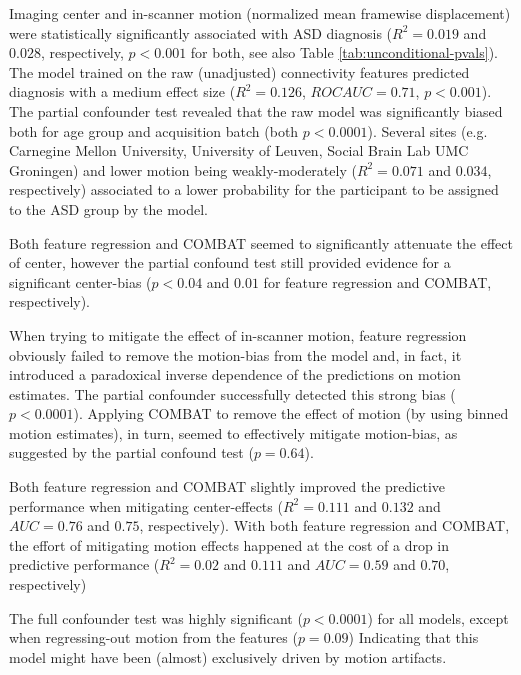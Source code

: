\documentclass{article}
\begin{document}
Imaging center and in-scanner motion (normalized mean framewise displacement) were statistically significantly associated with ASD diagnosis ($R^2=0.019$ and $0.028$, respectively, $p<0.001$ for both, see also Table \ref{tab:unconditional-pvals}). The model trained on the raw (unadjusted) connectivity features predicted diagnosis with a medium effect size ($R^2=0.126$, $ROC AUC = 0.71$, $p<0.001$).
The partial confounder test revealed that the raw model was significantly biased both for age group and acquisition batch (both $p<0.0001$). Several sites (e.g. Carnegine Mellon University, University of Leuven, Social Brain Lab UMC Groningen) and lower motion being weakly-moderately ($R^2=0.071$ and $0.034$, respectively) associated to a lower probability for the participant to be assigned to the ASD group by the model.

Both feature regression and COMBAT seemed to significantly attenuate the effect of center, however the partial confound test still provided evidence for a significant center-bias ($p < 0.04$ and $0.01$ for feature regression and COMBAT, respectively). 

When trying to mitigate the effect of in-scanner motion, feature regression obviously failed to remove the motion-bias from the model and, in fact, it introduced a paradoxical inverse dependence of the predictions on motion estimates. The partial confounder successfully detected this strong bias ($p<0.0001$). Applying COMBAT to remove the effect of motion (by using binned motion estimates), in turn, seemed to effectively mitigate motion-bias, as suggested by the partial confound test ($p=0.64$).

Both feature regression and COMBAT slightly improved the predictive performance when mitigating center-effects ($R^2=0.111$ and $0.132$ and $AUC=0.76$ and $0.75$, respectively). With both feature regression and COMBAT, the effort of mitigating motion effects happened at the cost of a drop in predictive performance ($R^2=0.02$ and $0.111$ and $AUC=0.59$ and $0.70$, respectively)

The full confounder test was highly significant ($p<0.0001$) for all models, except when regressing-out motion from the features ($p=0.09$) Indicating that this model might have been (almost) exclusively driven by motion artifacts.
\end{document}
